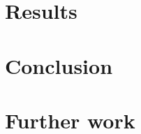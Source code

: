\documentclass[conference]{IEEEtran}
\begin{document}
\section{Results}


\section{Conclusion}


\section{Further work}








\end{document}
